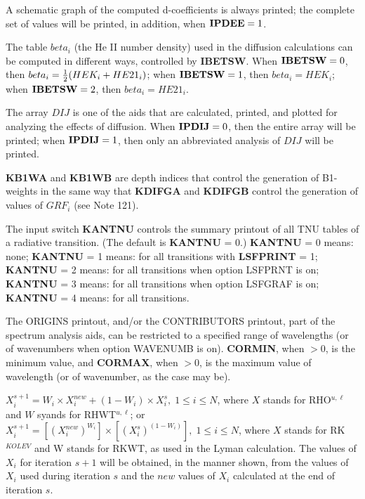 A schematic graph of the computed d-coefficients is always printed; the complete set of
values will be printed, in addition, when ${\bf IPDEE} = 1$.
\ej
\centerline{}
\space \noindent
The table $beta_i$ (the He II number density) used in the diffusion calculations can be
computed in different ways, controlled by {\bf IBETSW}. When ${\bf IBETSW} = 0$, then
$beta_i = { 1 \over 2} ( HEK_i + HE21_i )$; when ${\bf IBETSW} = 1$, then
$beta_i = HEK_i$; when ${\bf IBETSW} = 2$, then $beta_i = HE21_i$.
\blankline
\blankline
\centerline{}
\space \noindent
The array $DIJ$ is one of the aids that are calculated, printed, and plotted for analyzing
the effects of diffusion. When ${\bf IPDIJ} = 0$, then the entire array will be printed;
when ${\bf IPDIJ} = 1$, then only an abbreviated analysis of $DIJ$ will be printed.
\blankline
\blankline
\centerline{}
\space \noindent
{\bf KB1WA} and {\bf KB1WB} are depth indices that control the generation of B1-weights
in the same way that {\bf KDIFGA} and {\bf KDIFGB} control the generation of values of
$GRF_i$ (see Note 121).
\blankline
\blankline
\centerline{}
\space \noindent
The input switch {\bf KANTNU} controls the summary printout of all {TNU} tables of
a radiative transition. (The default is {\bf KANTNU} = 0.) \np
{\bf KANTNU} = 0 means: none; \np
{\bf KANTNU} = 1 means: for all transitions with {\bf LSFPRINT} = 1; \np
{\bf KANTNU} = 2 means: for all transitions when option LSFPRNT is on; \np
{\bf KANTNU} = 3 means: for all transitions when option LSFGRAF is on; \np
{\bf KANTNU} = 4 means: for all transitions.
\blankline
\blankline
\centerline{}
\space \noindent
The ORIGINS printout, and/or the CONTRIBUTORS printout, part of the spectrum
analysis aids, can be restricted to a specified range of wavelengths (or of
wavenumbers when option WAVENUMB is on). {\bf CORMIN}, when $> 0$, is the
minimum value, and {\bf CORMAX}, when $> 0$, is the maximum value of wavelength
(or of wavenumber, as the case may be).
\ej
\centerline{}
\space \noindent
$X^{s+1}_i = W_i \times X^{new}_i + {(1 - W_i)} \times X^s_i, \; 
1 \leq i \leq N$, where $X$ stands for RHO$^{u,\ell}$ and $W$ syands
for RHWT$^{u,\ell}$; or \np
$X^{s+1}_i = [ (X^{new}_i)^{W_i} ] \times [ (X^s_i)^{(1 - W_i)} ], \; 1 \leq i 
\leq N$, where $X$ stands for RK$^{KOLEV}$ and W stands for RKWT, as
used in the Lyman calculation. \np
The values of $X_i$ for iteration $s+1$ will be obtained, in the manner
shown, from the values of $X_i$ used during iteration $s$ and the $new$
values of $X_i$ calculated at the end of iteration $s$.

